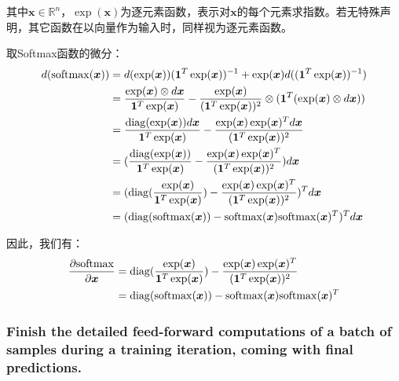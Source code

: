 \documentclass[12pt, a4paper]{article}
\newcommand{\ivec}{\bm}
\newcommand{\diag}{{\rm diag}}
\newcommand{\softmax}{{\rm softmax}}
\newcommand{\xv}{\ivec{x}}
\begin{document}
        其中$\xv \in \mathbb{R}^n$，$\exp(\xv)$为逐元素函数，表示对$\xv$的每个元素求指数。若无特殊声明，其它函数在以向量作为输入时，同样视为逐元素函数。

        取Softmax函数的微分：
        \begin{align*}
        d (\softmax(\xv))
        &= d (\exp(\xv)) (\ivec{1}^T \exp(\xv))^{-1} + \exp(\xv) d ((\ivec{1}^T \exp(\xv))^{-1}) \\
        &= \frac{\exp(\xv) \otimes d \xv}{\ivec{1}^T \exp(\xv)} - \frac{\exp(\xv)}{(\ivec{1}^T \exp(\xv))^2} \otimes (\ivec{1}^T (\exp(\xv) \otimes d \xv)) \\
        &= \frac{\diag(\exp(\xv)) d \xv}{\ivec{1}^T \exp(\xv)} - \frac{\exp(\xv) \exp(\xv)^T d \xv}{(\ivec{1}^T \exp(\xv))^2} \\
        &= (\frac{\diag(\exp(\xv))}{\ivec{1}^T \exp(\xv)} - \frac{\exp(\xv) \exp(\xv)^T}{(\ivec{1}^T \exp(\xv))^2}) d \xv \\
        &= (\diag(\frac{\exp(\xv)}{\ivec{1}^T \exp(\xv)}) - \frac{\exp(\xv) \exp(\xv)^T}{(\ivec{1}^T \exp(\xv))^2})^T d \xv \\
        &= (\diag(\softmax(\xv)) - \softmax(\xv) \softmax(\xv)^T)^T d \xv
        \end{align*}

        因此，我们有：
        \begin{equation}\begin{aligned}
        \frac{\partial \softmax}{\partial \xv}
        &= \diag(\frac{\exp(\xv)}{\ivec{1}^T \exp(\xv)}) - \frac{\exp(\xv) \exp(\xv)^T}{(\ivec{1}^T \exp(\xv))^2} \\
        &= \diag(\softmax(\xv)) - \softmax(\xv) \softmax(\xv)^T
        \end{aligned}\end{equation}

    \subsubsection{Finish the detailed feed-forward computations of a batch of samples during a training iteration, coming with final predictions.}
\end{document}

